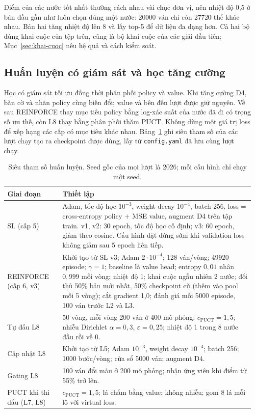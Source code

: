 Điểm của các nước tốt nhất thường cách nhau vài chục đơn vị, nên nhiệt độ 0{,}5 ở bản đầu gần như luôn chọn đúng một nước: \num{20000} ván chỉ còn \num{27720} thế khác nhau. Bản hai tăng nhiệt độ lên 8 và lấy top-5 để dữ liệu đa dạng hơn. Cả hai bộ dùng khai cuộc của tệp trên, cũng là bộ khai cuộc của các giải đầu tiên; Mục~\ref{sec:khai-cuoc} nêu hệ quả và cách kiểm soát.

\subsection{Huấn luyện có giám sát và học tăng cường}
Học có giám sát tối ưu đồng thời phân phối policy và value. Khi tăng cường D4, bàn cờ và nhãn policy cùng biến đổi; value và bên đến lượt được giữ nguyên. Về sau REINFORCE thay mục tiêu policy bằng log-xác suất của nước đã đi có trọng số ưu thế, còn L8 thay bằng phân phối thăm PUCT. Không dùng một giá trị loss để xếp hạng các cấp có mục tiêu khác nhau. Bảng~\ref{tab:sieu-tham-so} ghi siêu tham số của các lượt chạy tạo ra checkpoint được dùng, lấy từ \texttt{config.yaml} đã lưu cùng lượt chạy.

\begin{table}[H]
  \centering\small
  \caption{Siêu tham số huấn luyện. Seed gốc của mọi lượt là 2026; mỗi cấu hình chỉ chạy một seed.}
  \label{tab:sieu-tham-so}
  \begin{tabularx}{\textwidth}{@{}l X@{}}
    \toprule
    \textbf{Giai đoạn} & \textbf{Thiết lập} \\
    \midrule
    SL (cấp 5) & Adam, tốc độ học $10^{-3}$, weight decay $10^{-4}$, batch 256, loss = cross-entropy policy $+$ MSE value, augment D4 trên tập train. v1, v2: 30 epoch, tốc độ học cố định; v3: 60 epoch, giảm theo cosine. Cấu hình đặt dừng sớm khi validation loss không giảm sau 5 epoch liên tiếp. \\
    REINFORCE (cấp 6, v3) & Khởi tạo từ SL v3; Adam $2\cdot10^{-4}$; 128 ván/vòng; \num{49920} episode; $\gamma = 1$; baseline là value head; entropy $0{,}01$ nhân $0{,}999$ mỗi vòng; nhiệt độ 1; khai cuộc ngẫu nhiên 2 nước; đối thủ 50\% bản mới nhất, 50\% checkpoint cũ (thêm vào pool mỗi 5 vòng); cắt gradient 1{,}0; đánh giá mỗi \num{5000} episode, 100 ván trước L2 và L3. \\
    Tự đấu L8 & 50 vòng, mỗi vòng 200 ván ở 400 mô phỏng; $c_{\mathrm{PUCT}} = 1{,}5$; nhiễu Dirichlet $\alpha = 0{,}3$, $\varepsilon = 0{,}25$; nhiệt độ 1 trong 8 nước đầu rồi về 0. \\
    Cập nhật L8 & Khởi tạo từ L5; Adam $10^{-3}$, weight decay $10^{-4}$; batch 256; \num{1000} bước/vòng; cửa sổ \num{5000} ván; augment D4. \\
    Gating L8 & 100 ván đổi màu ở 200 mô phỏng; nhận ứng viên khi điểm từ 55\% trở lên. \\
    PUCT khi thi đấu (L7, L8) & $c_{\mathrm{PUCT}} = 1{,}5$; lá chấm bằng value; không nhiễu; gom 8 lá mỗi lô với virtual loss. \\
    \bottomrule
  \end{tabularx}
\end{table}


